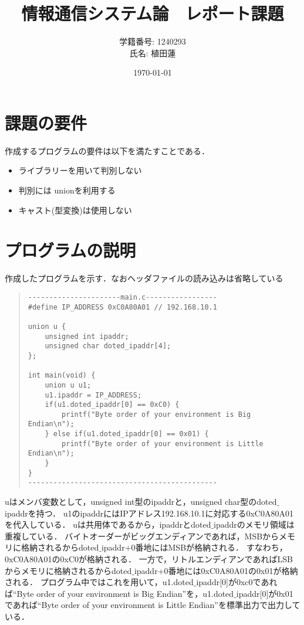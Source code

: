 \documentclass[a4paper,dvipdfmx]{jsarticle}
\title{情報通信システム論　レポート課題}
\author{学籍番号: 1240293 \\ 氏名: 植田蓮}
\date{\today}
\begin{document}
\maketitle
{}
\section{課題の要件}
作成するプログラムの要件は以下を満たすことである．

\begin{itemize}
  \item ライブラリーを用いて判別しない
  \item 判別には unionを利用する
  \item キャスト(型変換)は使用しない
\end{itemize}

\section{プログラムの説明}
作成したプログラムを示す．なおヘッダファイルの読み込みは省略している

\begin{quote}
\begin{verbatim}
----------------------main.c-----------------
#define IP_ADDRESS 0xC0A80A01 // 192.168.10.1

union u {
    unsigned int ipaddr;
    unsigned char doted_ipaddr[4];
};

int main(void) {
	union u u1; 
    u1.ipaddr = IP_ADDRESS; 
    if(u1.doted_ipaddr[0] == 0xC0) {
        printf("Byte order of your environment is Big Endian\n");
    } else if(u1.doted_ipaddr[0] == 0x01) {
        printf("Byte order of your environment is Little Endian\n");
    }
}
---------------------------------------------

\end{verbatim}
\end{quote}
uはメンバ変数として，unsigned int型のipaddrと，unsigned char型のdoted$\_$ipaddrを持つ．
u1のipaddrにはIPアドレス192.168.10.1に対応する0xC0A80A01を代入している．
uは共用体であるから，ipaddrとdoted$\_$ipaddrのメモリ領域は重複している．
バイトオーダーがビッグエンディアンであれば，MSBからメモリに格納されるからdoted$\_$ipaddr+0番地にはMSBが格納される．
すなわち，0xC0A80A01の0xC0が格納される．
一方で，リトルエンディアンであればLSBからメモリに格納されるからdoted$\_$ipaddr+0番地には0xC0A80A01の0x01が格納される．
プログラム中ではこれを用いて，u1.doted$\_$ipaddr[0]が0xc0であれば``Byte order of your environment is Big Endian''を，u1.doted$\_$ipaddr[0]が0x01であれば``Byte order of your environment is Little Endian''を標準出力で出力している．
\end{document}
